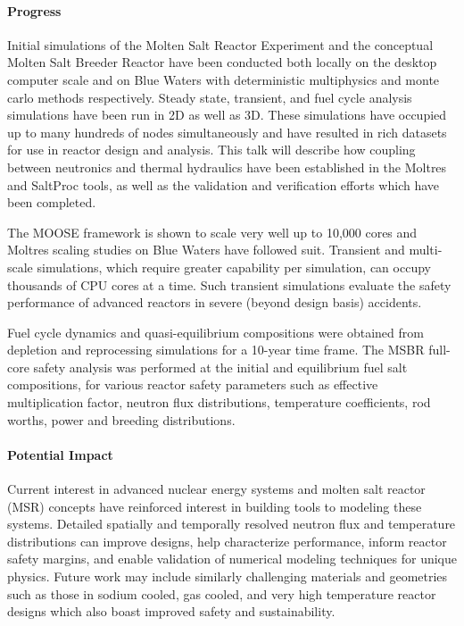 \documentclass[11pt]{article}
\begin{document}
\paragraph{Progress}

Initial simulations of the Molten Salt Reactor Experiment and the conceptual 
Molten Salt Breeder Reactor have been conducted both locally on the desktop
computer scale and on Blue Waters with deterministic multiphysics and monte 
carlo methods respectively. Steady state, transient, and fuel cycle analysis 
simulations have been run in 2D as well as 3D. These simulations
have occupied up to many hundreds of nodes simultaneously and have resulted in 
rich datasets for use in reactor design and analysis. This talk will
describe how coupling between neutronics and thermal hydraulics have been
established in the Moltres and SaltProc tools, as well as the validation 
and verification efforts which have been completed.

The MOOSE framework is shown to scale very well up to 10,000 cores and Moltres 
scaling studies on Blue Waters have followed suit.
Transient and multi-scale simulations, which require greater capability per
simulation, can occupy thousands of CPU cores at a time. Such transient
simulations evaluate the safety performance of advanced reactors in severe
(beyond design basis) accidents.


Fuel cycle dynamics and quasi-equilibrium compositions were obtained 
from depletion and reprocessing simulations for a 10-year time frame. The 
MSBR full-core safety analysis was performed at the initial and equilibrium 
fuel salt compositions, for various reactor safety parameters such as effective 
multiplication factor, neutron flux distributions, temperature coefficients, 
rod worths, power and breeding distributions.


\paragraph{Potential Impact}
Current interest in advanced nuclear energy systems and molten salt reactor 
(MSR) concepts have reinforced interest in building tools to modeling these 
systems.  Detailed spatially and temporally resolved neutron flux and 
temperature distributions can improve designs, help characterize performance, 
inform reactor safety margins, and enable validation of numerical modeling 
techniques for unique physics.  Future work may include similarly challenging 
materials and geometries such as those in sodium cooled, gas cooled, and very 
high temperature reactor designs which also boast improved safety and 
sustainability.  
\end{document}

